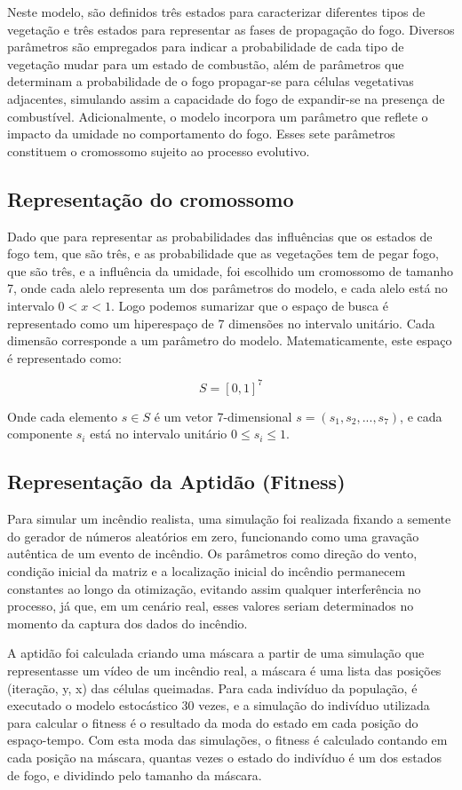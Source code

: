 \documentclass[12pt]{article}
\begin{document}
Neste modelo, são definidos três estados para caracterizar diferentes tipos de vegetação e três estados para representar as fases de propagação do fogo. Diversos parâmetros são empregados para indicar a probabilidade de cada tipo de vegetação mudar para um estado de combustão, além de parâmetros que determinam a probabilidade de o fogo propagar-se para células vegetativas adjacentes, simulando assim a capacidade do fogo de expandir-se na presença de combustível. Adicionalmente, o modelo incorpora um parâmetro que reflete o impacto da umidade no comportamento do fogo. Esses sete parâmetros constituem o cromossomo sujeito ao processo evolutivo.

\subsection{Representação do cromossomo}
Dado que para representar as probabilidades das influências que os estados de fogo tem, que são três, e as probabilidade que as vegetações tem de pegar fogo, que são três, e a influência da umidade, foi escolhido um cromossomo de tamanho 7, onde cada alelo representa um dos parâmetros do modelo, e cada alelo está no intervalo \(0<x<1\).
Logo podemos sumarizar que o espaço de busca é representado como um hiperespaço de 7 dimensões no intervalo unitário. Cada dimensão corresponde a um parâmetro do modelo. Matematicamente, este espaço é representado como:

\[ S = [0, 1]^7 \]

Onde cada elemento \( s \in S \) é um vetor 7-dimensional \( s = (s_1, s_2, ..., s_7) \), e cada componente \( s_i \) está no intervalo unitário \( 0 \leq s_i \leq 1 \).

\subsection{Representação da Aptidão (Fitness)}
Para simular um incêndio realista, uma simulação foi realizada fixando a semente do gerador de números aleatórios em zero, funcionando como uma gravação autêntica de um evento de incêndio. Os parâmetros como direção do vento, condição inicial da matriz e a localização inicial do incêndio permanecem constantes ao longo da otimização, evitando assim qualquer interferência no processo, já que, em um cenário real, esses valores seriam determinados no momento da captura dos dados do incêndio.

A aptidão foi calculada criando uma máscara a partir de uma simulação que representasse um vídeo de um incêndio real, a máscara é uma lista das posições (iteração, y, x) das células queimadas. Para cada indivíduo da população, é executado o modelo estocástico 30 vezes, e a simulação do indivíduo utilizada para calcular o fitness é o resultado da moda do estado em cada posição do espaço-tempo. Com esta moda das simulações, o fitness é calculado contando em cada posição na máscara, quantas vezes o estado do indivíduo é um dos estados de fogo, e dividindo pelo tamanho da máscara.
\end{document}
